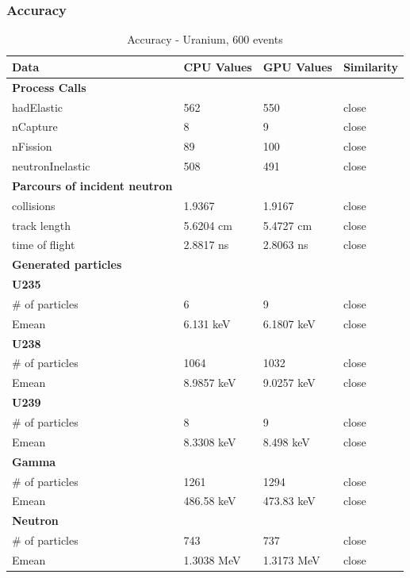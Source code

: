 \documentclass[12pt]{article}
\begin{document}
	\subsubsection{Accuracy}
		\begin{table}[H]
		\centering
		\caption{Accuracy - Uranium, 600 events}\label{sys4Acc}
		\begin{tabular}{lp{2.3cm}p{2.3cm}l}
		\toprule
		\bf Data & CPU Values & GPU Values & Similarity\\\midrule
		\bf Process Calls&&&\\
		hadElastic&562&550&close\\
		nCapture&8&9&close\\
		nFission&89&100&close\\
		neutronInelastic&508&491&close\\ 

		\midrule
		\bf Parcours of incident neutron&&&\\
		collisions&1.9367&1.9167&close\\
		track length&5.6204 cm&5.4727 cm&close\\
		time of flight&2.8817 ns&2.8063 ns&close\\

		\midrule
		\bf Generated particles&&&\\
		
		\bf{U235}&&&\\
		\# of particles&6&9&close\\
		Emean&6.131 keV&6.1807 keV&close\\
		
		\bf{U238}&&&\\
		\# of particles&1064&1032&close\\
		Emean&8.9857 keV&9.0257 keV&close\\
		
		\bf{U239}&&&\\
		\# of particles&8&9&close\\
		Emean&8.3308 keV&8.498 keV&close\\
		
		\bf{Gamma}&&&\\
		\# of particles&1261&1294&close\\
		Emean&486.58 keV&473.83 keV&close\\
		
		\bf{Neutron}&&&\\
		\# of particles&743&737&close\\
		Emean&1.3038 MeV&1.3173 MeV&close\\\bottomrule
		\end{tabular}
		\end{table}
		\break
\end{document}
